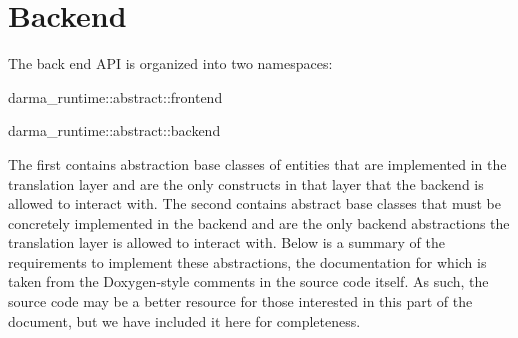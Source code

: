 
\chapter{Backend}
\label{chap:back_end}

The back end API is organized into two namespaces:
\begin{compactenum}
\item {\ttfamily darma\_runtime::abstract::frontend} 
\item {\ttfamily darma\_runtime::abstract::backend}  
\end{compactenum}

The first contains
abstraction base classes of entities that are implemented in the translation
layer and are the only constructs in that layer that the backend is
allowed to interact with.  The second contains abstract base classes that must be concretely implemented in the backend and
are the only backend abstractions the translation layer is allowed to interact
with.  Below is a summary of the requirements to implement these abstractions,
the documentation for which is taken from the Doxygen-style comments in
the source code itself.  As such, the source code may be a better resource for
those interested in this part of the document, but we have included it here for
completeness. 

